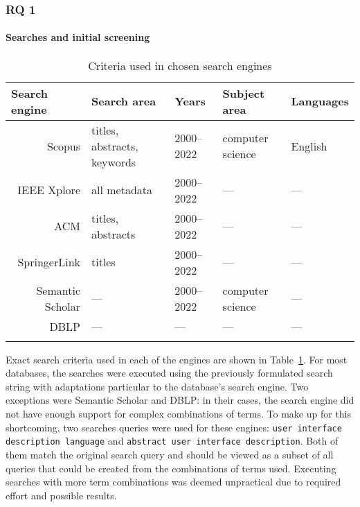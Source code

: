 \subsubsection{RQ 1}

\paragraph{Searches and initial screening}

\begin{table}[]
    \centering
    \caption{Criteria used in chosen search engines}
    \begin{tabular}{rllll}
        \toprule
        \multicolumn{1}{l}{\textbf{Search engine}} & \textbf{Search area}        & \textbf{Years} & \textbf{Subject area} & \textbf{Languages} \\
        \midrule
        Scopus                                     & titles, abstracts, keywords & 2000--2022     & computer science      & English            \\
        IEEE Xplore                                & all metadata                & 2000--2022     & ---                   & ---                \\
        ACM                                        & titles, abstracts           & 2000--2022     & ---                   & ---                \\
        SpringerLink                               & titles                      & 2000--2022     & ---                   & ---                \\
        Semantic Scholar                           & ---                         & 2000--2022     & computer science      & ---                \\
        DBLP                                       & ---                         & ---            & ---                   & ---                \\
        \bottomrule
        \label{tab:search-criteria-used}
    \end{tabular}
\end{table}

Exact search criteria used in each of the engines are shown in Table~\ref{tab:search-criteria-used}.
For most databases, the searches were executed using the previously formulated search string with adaptations particular to the database's search engine.
Two exceptions were Semantic Scholar and DBLP: in their cases, the search engine did not have enough support for complex combinations of terms.
To make up for this shortcoming, two searches queries were used for these engines: \texttt{user interface description language} and \texttt{abstract user interface description}.
Both of them match the original search query and should be viewed as a subset of all queries that could be created from the combinations of terms used.
Executing searches with more term combinations was deemed unpractical due to required effort and possible results.

